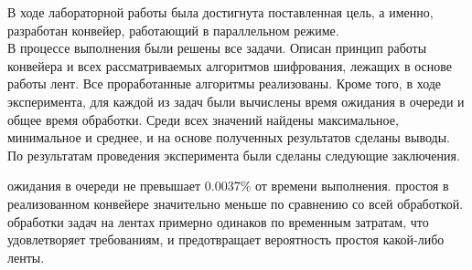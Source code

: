 В ходе лабораторной работы была достигнута поставленная цель, а именно, разработан конвейер, работающий в параллельном режиме.\\

В процессе выполнения были решены все задачи. Описан принцип работы конвейера и всех рассматриваемых алгоритмов шифрования, лежащих в основе работы лент. Все проработанные алгоритмы реализованы. Кроме того, в ходе эксперимента, для каждой из задач были вычислены время ожидания в очереди и общее время обработки. Среди всех значений найдены максимальное, минимальное и среднее, и на основе полученных результатов сделаны выводы.\\

По результатам проведения эксперимента были сделаны следующие заключения.
\begin{itemize}
	 ожидания в очереди не превышает 0.0037\% от времени выполнения.
	 простоя в реализованном конвейере значительно меньше по сравнению со всей обработкой.
	 обработки задач на лентах примерно одинаков по временным затратам, что удовлетворяет требованиям, и предотвращает вероятность простоя какой-либо ленты.
\end{itemize}